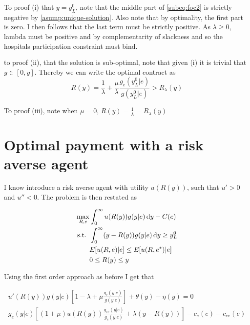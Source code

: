 To proof (i) that $y=y_L^0$, note that the middle part of \cref{subeq:foc2} is strictly negative by \cref{asump:unique-solution}. Also note that by optimality, the first part is zero. I then follows that the last term must be strictly positive. As $\lambda\geq0$, lambda must be positive and by complementarity of slackness and so the hospitals participation constraint must bind. 

to proof (ii), that the solution is sub-optimal, note that given (i) it is trivial that $y\in[0,y]$. Thereby we can write the optimal contract as 
\[
    R(y)=\frac{1}{\lambda}+\frac{\mu}{\lambda}\frac{g_e(y_L^0|e)}{g(y_L^0|e)}>R_\lambda(y)
\]


To proof (iii), note when $\mu=0$, $R(y)=\frac{1}{\lambda}=R_\lambda(y)$

\section{Optimal payment with a risk averse agent} %
\label{sec:optimal_payment_with_a_risk_averse_agent}
I know introduce a risk averse agent with utility $u(R(y))$, such that $u'>0$ and $u''<0$. The problem is then restated as 

\begin{subequations}
\label{eq:khun-tucker-ra}
\begin{align}
    \max_{R,e} & \int_0^{\infty}u(R(y))g(y|e)\dif y-C(e)\label{subeq:khun-tucker-ra1} \\
    \text{s.t. }    & \int_{0}^{\infty} (y-R(y))g(y|e)\dif y\geq y_L^0 \label{subeq:khun-tucker-ra2} \\
                    & E[u(R,e)|e]\leq E[u(R,e^*)|e] \label{subeq:khun-tucker-ra3}\\
                    & 0\leq R(y)\leq y \label{subeq:khun-tucker-ra4}
\end{align}
\end{subequations}

Using the first order approach as before I get that 

\begin{subequations}
\label{eq:lagrange-ra}
\begin{align}
    u'(R(y))g(y|e)\left[1-\lambda+\mu \frac{g_e(y|e)}{g(y|e)}\right] + \theta(y)-\eta(y)=0 \\
    g_e(y|e)\left[(1+\mu)u(R(y))\frac{g_{ee}(y|e)}{g_e(y|e)}+\lambda(y-R(y))\right]-c_e(e)-c_{ee}(e)
\end{align}
\end{subequations}

